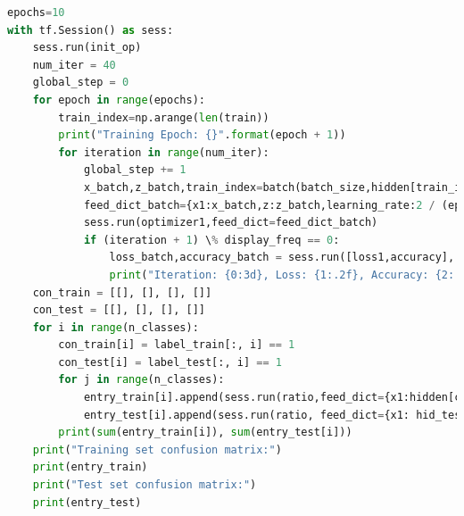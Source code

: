 \documentclass{article}
\begin{document}
\begin{lstlisting}[language=Python]
epochs=10
with tf.Session() as sess:
    sess.run(init_op)
    num_iter = 40
    global_step = 0
    for epoch in range(epochs):
        train_index=np.arange(len(train))
        print("Training Epoch: {}".format(epoch + 1))
        for iteration in range(num_iter):
            global_step += 1
            x_batch,z_batch,train_index=batch(batch_size,hidden[train_index,:],label_train[train_index,:])
            feed_dict_batch={x1:x_batch,z:z_batch,learning_rate:2 / (epoch+1)}
            sess.run(optimizer1,feed_dict=feed_dict_batch)
            if (iteration + 1) \% display_freq == 0:
                loss_batch,accuracy_batch = sess.run([loss1,accuracy], feed_dict=feed_dict_batch)
                print("Iteration: {0:3d}, Loss: {1:.2f}, Accuracy: {2:.01\%}".format((iteration + 1), loss_batch,accuracy_batch))
    con_train = [[], [], [], []]
    con_test = [[], [], [], []]
    for i in range(n_classes):
        con_train[i] = label_train[:, i] == 1
        con_test[i] = label_test[:, i] == 1
        for j in range(n_classes):
            entry_train[i].append(sess.run(ratio,feed_dict={x1:hidden[con_train[i]],indice:[j]}))
            entry_test[i].append(sess.run(ratio, feed_dict={x1: hid_test[con_test[i]],indice:[j]}))
        print(sum(entry_train[i]), sum(entry_test[i]))
    print("Training set confusion matrix:")
    print(entry_train)
    print("Test set confusion matrix:")
    print(entry_test)
\end{lstlisting}
\end{document}

